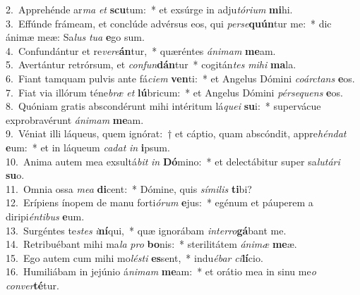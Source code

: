 {2.~}Apprehénde ar\textit{ma} \textit{et} \textbf{scu}tum:~* et exsúrge in adju\textit{tó}\textit{ri}\textit{um} \textbf{mi}hi.\\
{3.~}Effúnde frámeam, et conclúde advérsus eos, qui \textit{per}\textit{se}\textbf{quún}tur me:~* dic ánimæ meæ: Sa\textit{lus} \textit{tu}\textit{a} \textbf{e}go sum.\\
{4.~}Confundántur et re\textit{ve}\textit{re}\textbf{án}tur,~* quæréntes \textit{á}\textit{ni}\textit{mam} \textbf{me}am.\\
{5.~}Avertántur retrórsum, et \textit{con}\textit{fun}\textbf{dán}tur~* cogitán\textit{tes} \textit{mi}\textit{hi} \textbf{ma}la.\\
{6.~}Fiant tamquam pulvis ante fá\textit{ci}\textit{em} \textbf{ven}ti:~* et Angelus Dómini \textit{co}\textit{ár}\textit{ctans} \textbf{e}os.\\
{7.~}Fiat via illórum téne\textit{bræ} \textit{et} \textbf{lú}bricum:~* et Angelus Dómini \textit{pér}\textit{se}\textit{quens} \textbf{e}os.\\
{8.~}Quóniam gratis abscondérunt mihi intéritum lá\textit{que}\textit{i} \textbf{su}i:~* supervácue exprobravérunt \textit{á}\textit{ni}\textit{mam} \textbf{me}am.\\
{9.~}Véniat illi láqueus, quem ignórat:~† et cáptio, quam abscóndit, appre\textit{hén}\textit{dat} \textbf{e}um:~* et in láqueum \textit{ca}\textit{dat} \textit{in} \textbf{i}psum.\\
{10.~}Anima autem mea exsultá\textit{bit} \textit{in} \textbf{Dó}mino:~* et delectábitur super sa\textit{lu}\textit{tá}\textit{ri} \textbf{su}o.\\
{11.~}Omnia ossa \textit{me}\textit{a} \textbf{di}cent:~* Dómine, quis \textit{sí}\textit{mi}\textit{lis} \textbf{ti}bi?\\
{12.~}Erípiens ínopem de manu forti\textit{ó}\textit{rum} \textbf{e}jus:~* egénum et páuperem a diripi\textit{én}\textit{ti}\textit{bus} \textbf{e}um.\\
{13.~}Surgéntes te\textit{stes} \textit{i}\textbf{ní}qui,~* quæ ignorábam \textit{in}\textit{ter}\textit{ro}\textbf{gá}bant me.\\
{14.~}Retribuébant mihi ma\textit{la} \textit{pro} \textbf{bo}nis:~* sterilitátem \textit{á}\textit{ni}\textit{mæ} \textbf{me}æ.\\
{15.~}Ego autem cum mihi mo\textit{lé}\textit{sti} \textbf{es}sent,~* indu\textit{é}\textit{bar} \textit{ci}\textbf{lí}cio.\\
{16.~}Humiliábam in jejúnio á\textit{ni}\textit{mam} \textbf{me}am:~* et orátio mea in sinu me\textit{o} \textit{con}\textit{ver}\textbf{té}tur.\\
